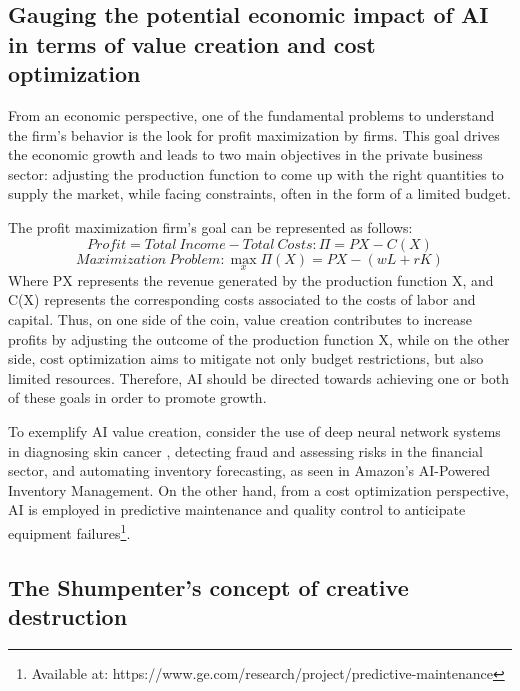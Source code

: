\documentclass[preprint, 3p,
authoryear]{elsarticle} %
\begin{document}
\hypertarget{gauging-the-potential-economic-impact-of-ai-in-terms-of-value-creation-and-cost-optimization}{%
\subsection{Gauging the potential economic impact of AI in terms of
value creation and cost
optimization}\label{gauging-the-potential-economic-impact-of-ai-in-terms-of-value-creation-and-cost-optimization}}

From an economic perspective, one of the fundamental problems to
understand the firm's behavior is the look for profit maximization by
firms. This goal drives the economic growth and leads to two main
objectives in the private business sector: adjusting the production
function to come up with the right quantities to supply the market,
while facing constraints, often in the form of a limited budget.

The profit maximization firm's goal can be represented as follows: \[
Profit = Total \ Income - Total \ Costs: \Pi = PX - C(X)
\] \[
Maximization \ Problem: \max_{x} \Pi(X) = PX - (wL + rK)
\] Where PX represents the revenue generated by the production function
X, and C(X) represents the corresponding costs associated to the costs
of labor and capital. Thus, on one side of the coin, value creation
contributes to increase profits by adjusting the outcome of the
production function X, while on the other side, cost optimization aims
to mitigate not only budget restrictions, but also limited resources.
Therefore, AI should be directed towards achieving one or both of these
goals in order to promote growth.

To exemplify AI value creation, consider the use of deep neural network
systems in diagnosing skin cancer \citep{cancer}, detecting fraud and
assessing risks in the financial sector, and automating inventory
forecasting, as seen in Amazon's AI-Powered Inventory Management. On the
other hand, from a cost optimization perspective, AI is employed in
predictive maintenance and quality control to anticipate equipment
failures\footnote{Available at:
  https://www.ge.com/research/project/predictive-maintenance}.

\hypertarget{the-shumpenters-concept-of-creative-destruction}{%
\subsection{The Shumpenter's concept of creative
destruction}\label{the-shumpenters-concept-of-creative-destruction}}
\end{document}
